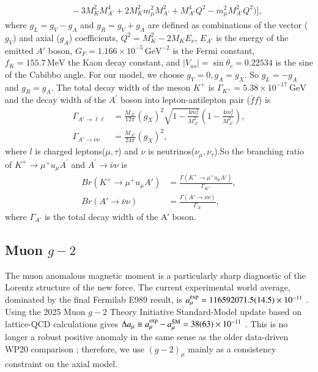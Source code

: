 \documentclass[onecolumn, aps, nofootinbib, prd, preprint, floats, floatfix, amsmath, amssymb, superscriptaddress, preprintnumbers]{revtex4-1}
\begin{document}
{\begin{equation}
\begin{split}
&\quad - 3 M_K^2 M_{A'}^4 + 2 M_K^2 m_\mu^2 M_{A'}^2 + M_{A'}^4 Q^2 - m_\mu^2 M_{A'}^2 Q^2) \Big],
\end{split}
\end{equation}
where $g_L = g_V - g_A$ and $g_R = g_V + g_A$ are defined as combinations of the vector ($g_V$) and axial ($g_A$) coefficients, $Q^2 = M_K^2 - 2M_K E_{\nu}$, $E_{A'}$ is the energy of the emitted $A'$ boson, $G_F = 1.166 \times 10^{-5}\,\text{GeV}^{-2}$ is the Fermi constant, $f_K = 155.7\,\text{MeV}$ the Kaon decay constant, and $|V_{us}| = \sin\theta_c = 0.22534$ is the sine of the Cabibbo angle. 
For our model, we choose $g_V=0,g_A=g_X$. So $g_L = - g_A$ and $g_R = g_A$.
The total decay width of the meson $K^{+}$ is $\Gamma_{K^{+}} = 5.38 \times 10^{-17}\ \text{GeV}$ and the decay width of the $A^\prime$ boson into lepton-antilepton pair ($\bar{f}f$) is 
\begin{align}
    \Gamma_{A' \to \bar{\ell}\ell} &= \frac{M_{A'}}{12\pi} (g_X)^2 \sqrt{1 - \frac{4m_\ell^2}{M_{A'}^2}} \left(1 - \frac{4m_\ell^2}{M_{A'}^2}\right), \\
    \Gamma_{A' \to \bar{\nu}\nu} &= \frac{M_{A'}}{24\pi} (g_X)^2 ,
\end{align}
where $l$ is charged leptons($\mu,\tau$) and $\nu$ is neutrinos($\nu_\mu,\nu_\tau$).So the branching ratio of $K^{+} \rightarrow \mu^{+} u_{\mu} A^{\prime}$ and $A^{\prime} \rightarrow \bar{\nu}\nu$ is 
\begin{align}
    Br(K^+ \to \mu^+ 
u_\mu A') &= \frac{\Gamma(K^+ \to \mu^+ 
u_\mu A')}{\Gamma_{K^+}}, \\
   Br(A' \to \bar{\nu} 
\nu) &= \frac{\Gamma(A' \to \bar{\nu} 
\nu)}{\Gamma_{A'}},
\end{align}
where $\Gamma_{A'}$ is the total decay width of the A′ boson.
}

\subsection{Muon $g-2$}
\label{sec:muon_g-2}


The muon anomalous magnetic moment is a particularly sharp diagnostic of the Lorentz structure of the new force. The current experimental world average, dominated by the final Fermilab E989 result, is $a_\mu^{\rm exp}=116592071.5(14.5)\times10^{-11}$ \cite{Muong-2:2025xyk}. Using the 2025 Muon $g-2$ Theory Initiative Standard-Model update based on lattice-QCD calculations gives $\Delta a_\mu\equiv a_\mu^{\rm exp}-a_\mu^{\rm SM} =38(63)\times10^{-11}$ \cite{Muong-2:2025xyk,Aliberti:2025beg}. This is no longer a robust positive anomaly in the same sense as the older data-driven WP20 comparison \cite{Aoyama:2020ynm}; therefore, we use $(g-2)_\mu$ mainly as a consistency constraint on the axial model.
\end{document}
